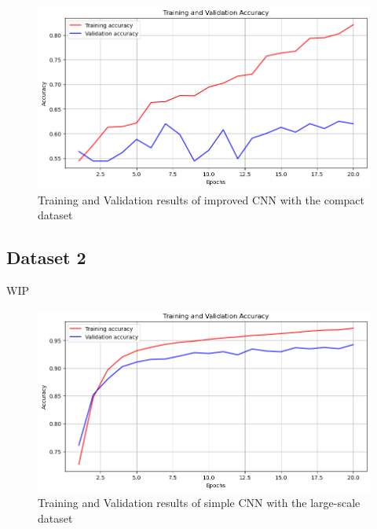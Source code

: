 \documentclass[final]{cvpr}
\begin{document}
\begin{figure}[t]
   \centering
   \includegraphics[width=0.9\linewidth]{img/ex-d1-improvedcnn-accuracy-results.png}
   \caption{Training and Validation results of improved CNN with the compact dataset}
   \label{fig:ex-d1-improvedcnn-results}
\end{figure}



\subsection{Dataset 2}

WIP

\begin{figure}[t]
   \centering
   \includegraphics[width=0.9\linewidth]{img/ex-d2-simplecnn-accuracy-results.png}
   \caption{Training and Validation results of simple CNN with the large-scale dataset}
   \label{fig:ex-d2-simplecnn-results}
\end{figure}
\end{document}
